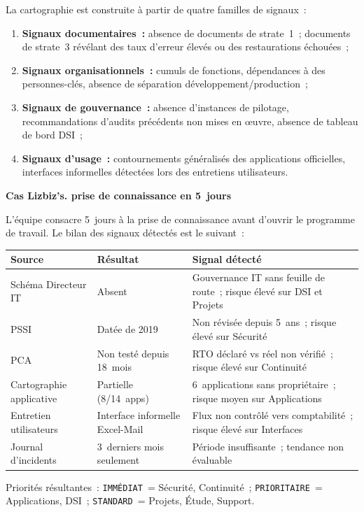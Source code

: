 La cartographie est construite à partir de quatre familles de signaux~:
\begin{enumerate}
    \item \textbf{Signaux documentaires~:} absence de documents de strate~1~;
        documents de strate~3 révélant des taux d'erreur élevés ou des restaurations
        échouées~;
    \item \textbf{Signaux organisationnels~:} cumuls de fonctions, dépendances à des
        personnes-clés, absence de séparation développement/production~;
    \item \textbf{Signaux de gouvernance~:} absence d'instances de pilotage, recommandations
        d'audits précédents non mises en œuvre, absence de tableau de bord DSI~;
    \item \textbf{Signaux d'usage~:} contournements généralisés des applications
        officielles, interfaces informelles détectées lors des entretiens utilisateurs.
\end{enumerate}

\begin{boxlizbiz}
\textbf{Cas Lizbiz's. prise de connaissance en 5~jours}

L'équipe consacre 5~jours à la prise de connaissance avant d'ouvrir le programme de
travail. Le bilan des signaux détectés est le suivant~:

\smallskip
\begin{tabular}{p{3.2cm}p{2.8cm}p{6cm}}
\toprule
\textbf{Source} & \textbf{Résultat} & \textbf{Signal détecté} \\
\midrule
Schéma Directeur IT & Absent &
    Gouvernance IT sans feuille de route~; risque élevé sur DSI et Projets \\
PSSI & Datée de 2019 &
    Non révisée depuis 5~ans~; risque élevé sur Sécurité \\
PCA & Non testé depuis 18~mois &
    RTO déclaré vs réel non vérifié~; risque élevé sur Continuité \\
Cartographie applicative & Partielle (8/14~apps) &
    6~applications sans propriétaire~; risque moyen sur Applications \\
Entretien utilisateurs & Interface informelle Excel-Mail &
    Flux non contrôlé vers comptabilité~; risque élevé sur Interfaces \\
Journal d'incidents & 3~derniers mois seulement &
    Période insuffisante~; tendance non évaluable \\
\bottomrule
\end{tabular}

\smallskip
Priorités résultantes~: \texttt{IMMÉDIAT}~= Sécurité, Continuité~;
\texttt{PRIORITAIRE}~= Applications, DSI~;
\texttt{STANDARD}~= Projets, Étude, Support.
\end{boxlizbiz}

